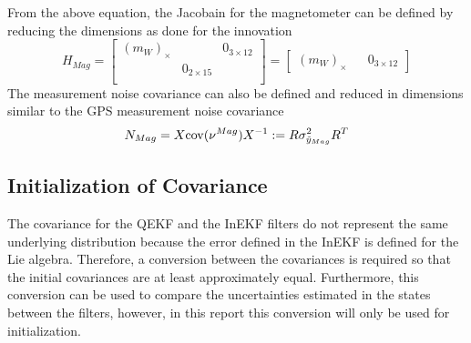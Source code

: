 From the above equation, the Jacobain for the magnetometer can be defined by reducing the dimensions as done for the innovation
\begin{equation}
        H_{Mag} = \begin{bmatrix}
            (m_W)_{\times} & & 0_{3 \times 12} \\
            & 0_{2 \times 15} &\\
            \end{bmatrix} = \begin{bmatrix}
                (m_W)_{\times} & & 0_{3 \times 12}
            \end{bmatrix}
    \label{eq: H_mag InEKF}
\end{equation}
The measurement noise covariance can also be defined and reduced in dimensions similar to the GPS measurement noise covariance
\begin{equation}
    N_{Mag} = X \mathrm{cov}(\nu^{Mag}) X^{-1} := R \sigma^2_{\Tilde{y}_{Mag}} R^T
    \label{eq: N mag InEKF}
\end{equation}


\subsection{Initialization of Covariance}
The covariance for the QEKF and the InEKF filters do not represent the same underlying distribution because the error defined in the InEKF is defined for the Lie algebra. Therefore, a conversion between the covariances is required so that the initial covariances are at least approximately equal. Furthermore, this conversion can be used to compare the uncertainties estimated in the states between the filters, however, in this report this conversion will only be used for initialization.

